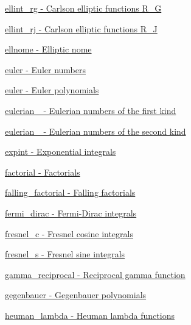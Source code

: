 \begin{DoxyItemize}
\item \hyperlink{group__gnu__math__spec__func_gab525116e1b311da90e2745366ac314eb}{ellint\+\_\+rg -\/ Carlson elliptic functions R\+\_\+G}
\item \hyperlink{group__gnu__math__spec__func_gaf9a96979913713963c5f4edeba8c7f5a}{ellint\+\_\+rj -\/ Carlson elliptic functions R\+\_\+J}
\item \hyperlink{group__gnu__math__spec__func_ga7bfb34f8b5c0ed7c72040f9cb7034bba}{ellnome -\/ Elliptic nome}
\item \hyperlink{group__gnu__math__spec__func_gac956e6457ab7d0d1765d281e73073f55}{euler -\/ Euler numbers}
\item \hyperlink{group__gnu__math__spec__func_gac956e6457ab7d0d1765d281e73073f55}{euler -\/ Euler polynomials}
\item \hyperlink{group__gnu__math__spec__func_gadfd8810a97655d2cdd1b0e3af68a79d3}{eulerian\+\_ -\/ Eulerian numbers of the first kind}
\item \hyperlink{group__gnu__math__spec__func_ga9bc456941d5e35cf54ec9c50f2e52884}{eulerian\+\_ -\/ Eulerian numbers of the second kind}
\item \hyperlink{group__gnu__math__spec__func_ga2cfc699129ceac9cfed87c61e6dc0e08}{expint -\/ Exponential integrals}
\item \hyperlink{group__gnu__math__spec__func_ga48bc268969bfc03eaeaf4bfd457bb25c}{factorial -\/ Factorials}
\item \hyperlink{group__gnu__math__spec__func_gad2388b5c45ec3d5d5f80032b08a03e7e}{falling\+\_\+factorial -\/ Falling factorials}
\item \hyperlink{group__gnu__math__spec__func_ga47dd583a4f3a19f797a5e074e357ba36}{fermi\+\_\+dirac -\/ Fermi-\/\+Dirac integrals}
\item \hyperlink{group__gnu__math__spec__func_gab6a34ce43bad4e8181ad9c40aebb9ada}{fresnel\+\_\+c -\/ Fresnel cosine integrals}
\item \hyperlink{group__gnu__math__spec__func_gaaf6e2b182d0abde6fde72c0b8b9f959c}{fresnel\+\_\+s -\/ Fresnel sine integrals}
\item \hyperlink{group__gnu__math__spec__func_ga5d0da7c5a9ba020da4ed87785a682133}{gamma\+\_\+reciprocal -\/ Reciprocal gamma function}
\item \hyperlink{group__gnu__math__spec__func_ga793df814fb4e1b60e926ead0be14cc87}{gegenbauer -\/ Gegenbauer polynomials}
\item \hyperlink{group__gnu__math__spec__func_gab73b2a75a662785fa102926dca3be59f}{heuman\+\_\+lambda -\/ Heuman lambda functions}

\end{DoxyItemize}
